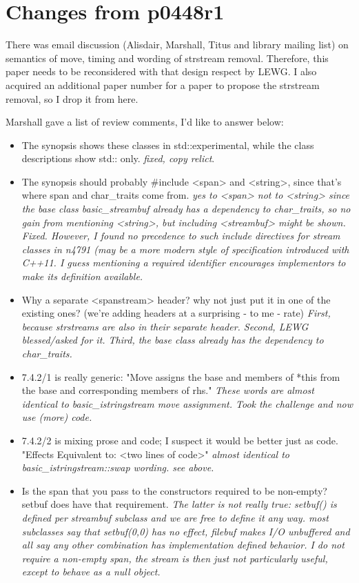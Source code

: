 \documentclass[ebook,11pt,article]{memoir}
\begin{document}
\section{Changes from p0448r1}
There was email discussion (Alisdair, Marshall, Titus and library mailing list) on semantics of move, timing and wording of strstream removal. Therefore, this paper needs to be reconsidered with that design respect by LEWG. I also acquired an additional paper number for a paper to propose the strstream removal, so I drop it from here.

Marshall gave a list of review comments, I'd like to answer below:
\begin{itemize}

\item  
The synopsis shows these classes in std::experimental, while the class descriptions show std:: only.
\textit{fixed, copy relict}.
\item  
The synopsis should probably \#include <span> and <string>, since that's where span and char_traits come from.
\textit{yes to <span> not to <string> since the base class basic_streambuf already has a dependency to char_traits, so no gain from mentioning <string>, but including <streambuf> might be shown. Fixed. However, I found no precedence to such include directives for stream classes in n4791 (may be a more modern style of specification introduced with C++11. I guess mentioning a required identifier encourages implementors to make its definition available. }
\item 
Why a separate <spanstream> header? why not just put it in one of the existing ones? 
       (we're adding headers at a surprising - to me - rate)
\textit{First, because strstreams are also in their separate header. Second, LEWG blessed/asked for it.
Third, the base class already has the dependency to char_traits.}
\item  7.4.2/1 is really generic: "Move assigns the base and members of *this from the base and corresponding members of rhs."
\textit{These words are almost identical to basic_istringstream move assignment. Took the challenge and now use (more) code.}
\item  7.4.2/2 is mixing prose and code; I suspect it would be better just as code. "Effects Equivalent to: <two lines of code>"
\textit{almost identical to basic_istringstream::swap wording. see above.}
\item  Is the span that you pass to the constructors required to be non-empty?  setbuf does have that requirement.
\textit{The latter is not really true: setbuf() is defined per streambuf subclass and we are free to define it any way. most subclasses say that setbuf(0,0) has no effect, filebuf makes I/O unbuffered and all say any other combination has implementation defined behavior. I do not require a non-empty span, the stream is then just not particularly useful, except to behave as a null object.}
\end{itemize}
\end{document}
